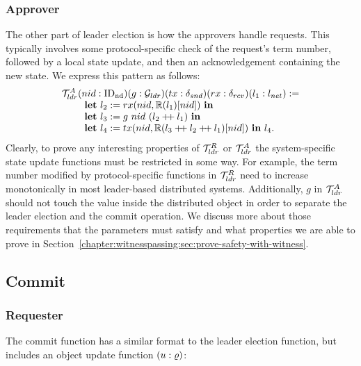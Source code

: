 \subsubsection{Approver}
The other part of leader election is how the approvers handle requests.
This typically involves some protocol-specific check of the request's
term number, followed by a local state update, and then an acknowledgement
containing the new state. We express this pattern as follows:
$$
\begin{array}{l}
	\mathcal{T}^{A}_{ldr} (nid: \mathrm{ID_{nd}}) (g:  \mathcal{G}_{ldr})
	(tx: \delta_{snd})(rx: \delta_{rcv})(l_1  :{l_{net}} ) := \\
\ \ \ \ \ \ \ \mbox{\textbf{let}} \ l_2 := rx(nid, \mathbb{R}(l_1)[nid]) \
  \mbox{\textbf{in}} \\
\ \ \ \ \ \ \ \mbox{\textbf{let}}\ l_3  := g\ nid \ (l_2 \mathbin{+\mkern-4mu+} l_1) \ \mbox{\textbf{in}} \\
\ \ \ \ \ \ \ \mbox{\textbf{let}} \ l_4 :=  tx(nid, \mathbb{R}(l_3 \mathbin{+\mkern-4mu+} l_2 \mathbin{+\mkern-4mu+} l_1)[nid]) \ \mbox{\textbf{in}} \ l_4.
   \\
\end{array}
$$
Clearly, to prove any interesting properties of $\mathcal{T}^{R}_{ldr}$ or $\mathcal{T}^{A}_{ldr}$
the system-specific state update functions must be restricted in some way.
For example, the term number modified by protocol-specific functions in $\mathcal{T}^{R}_{ldr}$
need to increase monotonically in most leader-based distributed systems.
Additionally, $g$ in $\mathcal{T}^{A}_{ldr}$ should not touch the value inside
the distributed object in order to separate the leader election and the commit operation.
We discuss more about those requirements that the parameters must satisfy and what properties we
are able to prove in Section~\ref{chapter:witnesspassing:sec:prove-safety-with-witness}.

\subsection{Commit}
\label{chapter:witnesspassing:subsec:commit}

\subsubsection{Requester}
The commit function has a similar format to the leader election function, but
includes an object update function $(u : \varrho)$:

